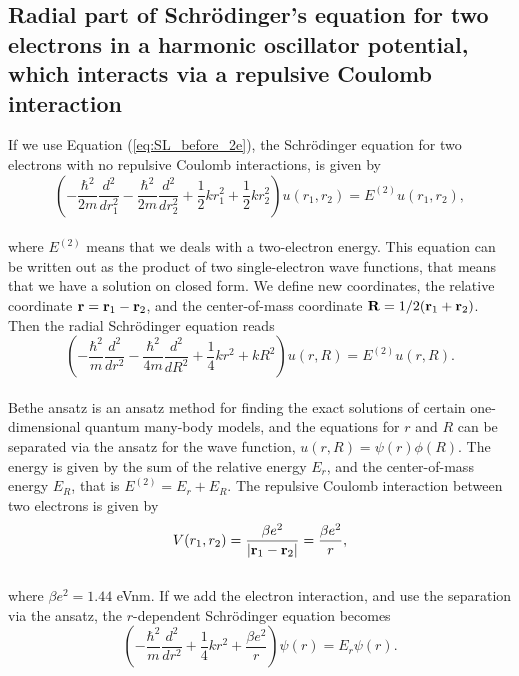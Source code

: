 \documentclass[12pt]{article}
\begin{document}
\begin{flushleft}
\subsection{Radial part of Schr\"odinger's equation for two electrons in a harmonic oscillator potential, which interacts via a repulsive Coulomb interaction}
If we use Equation (\ref{eq:SL_before_2e}), the Schr\"odinger equation for two electrons with no repulsive Coulomb interactions, is given by\\
\vspace{5mm}
$$\left(  -\frac{\hbar^2}{2 m} \frac{d^2}{dr_1^2} -\frac{\hbar^2}{2 m} \frac{d^2}{dr_2^2}+ \frac{1}{2}k r_1^2+ \frac{1}{2}k r_2^2\right)u(r_1,r_2)  = E^{(2)} u(r_1,r_2),$$\\
\vspace{5mm}
where $E^{(2)}$ means that we deals with a two-electron energy. This equation can be written out as the product of two single-electron wave functions, that means that we have a solution on closed form. We define new coordinates, the relative coordinate ${\bf r} = {\bf r}_1-{\bf r}_2$, and the center-of-mass coordinate ${\bf R} = 1/2({\bf r}_1+{\bf r}_2)$. Then the radial Schr\"odinger equation reads\\
\vspace{5mm}
$$\left(  -\frac{\hbar^2}{m} \frac{d^2}{dr^2} -\frac{\hbar^2}{4 m} \frac{d^2}{dR^2}+ \frac{1}{4} k r^2+  kR^2\right)u(r,R)  = E^{(2)} u(r,R).$$\\
\vspace{5mm}
Bethe ansatz is an ansatz method for finding the exact solutions of certain one-dimensional quantum many-body models, and the equations for $r$ and $R$ can be separated via the ansatz for the 
wave function, $u(r,R) = \psi(r)\phi(R)$. The energy is given by the sum of the relative energy $E_r$, and the center-of-mass energy $E_R$, that
is $E^{(2)}=E_r+E_R$. The repulsive Coulomb interaction between two electrons is given by\\
\vspace{5mm}
$$V(r_1,r_2) = \frac{\beta e^2}{|{\bf r}_1-{\bf r}_2|}=\frac{\beta e^2}{r},$$\\
where $\beta e^2=1.44$ eVnm. If we add the electron interaction, and use the separation via the ansatz, the $r$-dependent Schr\"odinger equation becomes\\
\vspace{5mm}
$$\left(  -\frac{\hbar^2}{m} \frac{d^2}{dr^2}+ \frac{1}{4}k r^2+\frac{\beta e^2}{r}\right)\psi(r)  = E_r \psi(r).$$\\

\end{flushleft}
\end{document}
